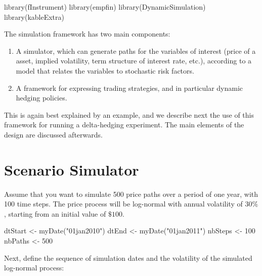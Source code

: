 \documentclass[justified]{tufte-book}
\newenvironment{Shaded}{}{}
\newcommand{\DecValTok}[1]{\textcolor[rgb]{0.25,0.63,0.44}{#1}}
\newcommand{\FunctionTok}[1]{\textcolor[rgb]{0.02,0.16,0.49}{#1}}
\newcommand{\NormalTok}[1]{#1}
\newcommand{\OtherTok}[1]{\textcolor[rgb]{0.00,0.44,0.13}{#1}}
\newcommand{\StringTok}[1]{\textcolor[rgb]{0.25,0.44,0.63}{#1}}
\begin{document}
\begin{Shaded}
\begin{Highlighting}[]
\FunctionTok{library}\NormalTok{(fInstrument)}
\FunctionTok{library}\NormalTok{(empfin)}
\FunctionTok{library}\NormalTok{(DynamicSimulation)}
\FunctionTok{library}\NormalTok{(kableExtra)}
\end{Highlighting}
\end{Shaded}

The simulation framework has two main components:

\begin{enumerate}
\def\labelenumi{\arabic{enumi}.}
\item
  A simulator, which can generate paths for the variables of interest
  (price of a asset, implied volatility, term structure of interest
  rate, etc.), according to a model that relates the variables to
  stochastic risk factors.
\item
  A framework for expressing trading strategies, and in particular
  dynamic hedging policies.
\end{enumerate}

This is again best explained by an example, and we describe next the use
of this framework for running a delta-hedging experiment. The main
elements of the design are discussed afterwards.

\hypertarget{scenario-simulator}{%
\section{Scenario Simulator}\label{scenario-simulator}}

Assume that you want to simulate 500 price paths over a period of one
year, with 100 time steps. The price process will be log-normal with
annual volatility of \(30\%\), starting from an initial value of \(\$100\).

\begin{Shaded}
\begin{Highlighting}[]
\NormalTok{dtStart }\OtherTok{\textless{}{-}} \FunctionTok{myDate}\NormalTok{(}\StringTok{"01jan2010"}\NormalTok{)}
\NormalTok{dtEnd }\OtherTok{\textless{}{-}} \FunctionTok{myDate}\NormalTok{(}\StringTok{"01jan2011"}\NormalTok{)}
\NormalTok{nbSteps }\OtherTok{\textless{}{-}} \DecValTok{100}
\NormalTok{nbPaths }\OtherTok{\textless{}{-}} \DecValTok{500}
\end{Highlighting}
\end{Shaded}

Next, define the sequence of simulation dates and the volatility of the simulated log-normal process:
\end{document}
